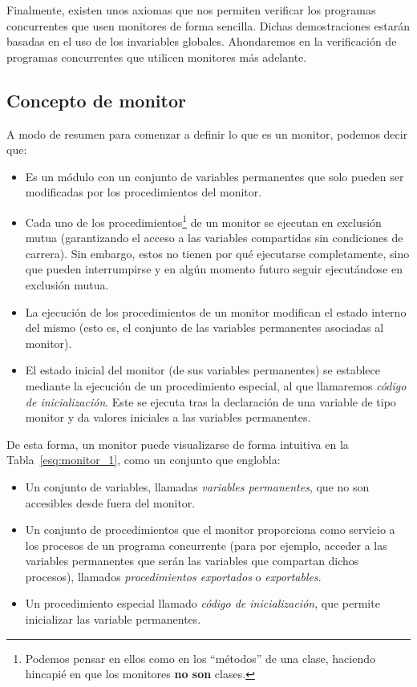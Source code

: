 Finalmente, existen unos axiomas que nos permiten verificar los programas concurrentes que usen monitores de forma sencilla. Dichas demostraciones estarán basadas en el uso de los invariables globales. Ahondaremos en la verificación de programas concurrentes que utilicen monitores más adelante.

\subsection{Concepto de monitor}\label{sec:concepto_de_monitor}
A modo de resumen para comenzar a definir lo que es un monitor, podemos decir que:
\begin{itemize}
    \item Es un módulo con un conjunto de variables permanentes que solo pueden ser modificadas por los procedimientos del monitor.
    \item Cada uno de los procedimientos\footnote{Podemos pensar en ellos como en los ``métodos'' de una clase, haciendo hincapié en que los monitores \textbf{no son} clases.} de un monitor se ejecutan en exclusión mutua (garantizando el acceso a las variables compartidas sin condiciones de carrera). Sin embargo, estos no tienen por qué ejecutarse completamente, sino que pueden interrumpirse y en algún momento futuro seguir ejecutándose en exclusión mutua.
    \item La ejecución de los procedimientos de un monitor modifican el estado interno del mismo (esto es, el conjunto de las variables permanentes asociadas al monitor).
    \item El estado inicial del monitor (de sus variables permanentes) se establece mediante la ejecución de un procedimiento especial, al que llamaremos \textit{código de inicialización}. Este se ejecuta tras la declaración de una variable de tipo monitor y da valores iniciales a las variables permanentes.
\end{itemize}
De esta forma, un monitor puede visualizarse de forma intuitiva en la Tabla~\ref{esq:monitor_1}, como un conjunto que englobla:
\begin{itemize}
    \item Un conjunto de variables, llamadas \textit{variables permanentes}, que no son accesibles desde fuera del monitor.
    \item Un conjunto de procedimientos que el monitor proporciona como servicio a los procesos de un programa concurrente (para por ejemplo, acceder a las variables permanentes que serán las variables que compartan dichos procesos), llamados \textit{procedimientos exportados} o \textit{exportables}.
    \item Un procedimiento especial llamado \textit{código de inicialización}, que permite inicializar las variable permanentes.
\end{itemize}

